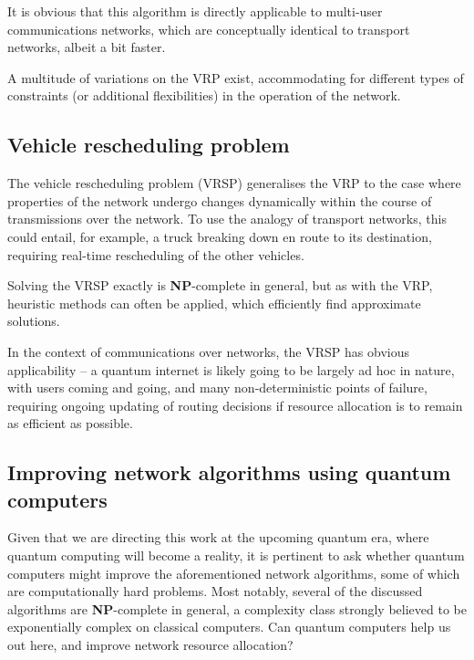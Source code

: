 \documentclass[aps, rmp, twocolumn, amsmath, amssymb, nofootinbib, superscriptaddress, longbibliography, floatfix, table-of-contents, eqsecnum]{revtex4-1}
\begin{document}
It is obvious that this algorithm is directly applicable to multi-user communications networks, which are conceptually identical to transport networks, albeit a bit faster. 

A multitude of variations on the VRP exist, accommodating for different types of constraints (or additional flexibilities) in the operation of the network.

%
%

\subsection{Vehicle rescheduling problem} \label{sec:VRSP} 

The vehicle rescheduling problem (VRSP) generalises the VRP to the case where properties of the network undergo changes dynamically within the course of transmissions over the network. To use the analogy of transport networks, this could entail, for example, a truck breaking down en route to its destination, requiring real-time rescheduling of the other vehicles.

Solving the VRSP exactly is \textbf{NP}-complete in general, but as with the VRP, heuristic methods can often be applied, which efficiently find approximate solutions.

In the context of communications over networks, the VRSP has obvious applicability -- a quantum internet is likely going to be largely ad hoc in nature, with users coming and going, and many non-deterministic points of failure, requiring ongoing updating of routing decisions if resource allocation is to remain as efficient as possible.

%
%

\subsection{Improving network algorithms using quantum computers} 

Given that we are directing this work at the upcoming quantum era, where quantum computing will become a reality, it is pertinent to ask whether quantum computers might improve the aforementioned network algorithms, some of which are computationally hard problems. Most notably, several of the discussed algorithms are \textbf{NP}-complete in general, a complexity class strongly believed to be exponentially complex on classical computers. Can quantum computers help us out here, and improve network resource allocation?
\end{document}
